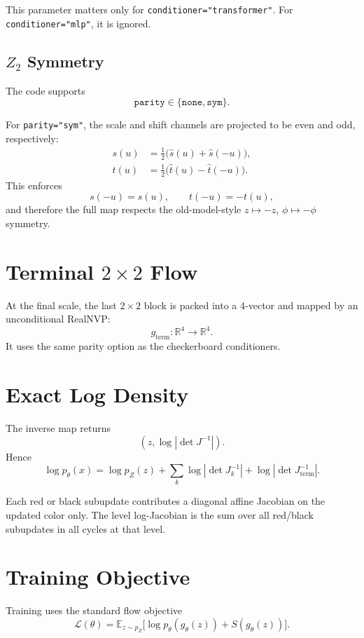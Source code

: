 \documentclass[11pt]{article}
\begin{document}
This parameter matters only for \texttt{conditioner="transformer"}. For
\texttt{conditioner="mlp"}, it is ignored.

\subsection{$Z_2$ Symmetry}

The code supports
\[
\texttt{parity}\in\{\texttt{none},\texttt{sym}\}.
\]

For \texttt{parity="sym"}, the scale and shift channels are projected to be
even and odd, respectively:
\begin{align}
s(u) &= \frac12 \bigl(\hat s(u) + \hat s(-u)\bigr), \\
t(u) &= \frac12 \bigl(\hat t(u) - \hat t(-u)\bigr).
\end{align}
This enforces
\[
s(-u)=s(u),\qquad t(-u)=-t(u),
\]
and therefore the full map respects the old-model-style
$z\mapsto -z$, $\phi\mapsto -\phi$ symmetry.

\section{Terminal $2\times 2$ Flow}

At the final scale, the last $2\times 2$ block is packed into a $4$-vector and
mapped by an unconditional RealNVP:
\[
g_{\mathrm{term}}:\mathbb{R}^4\to \mathbb{R}^4.
\]
It uses the same parity option as the checkerboard conditioners.

\section{Exact Log Density}

The inverse map returns
\[
(z,\log |\det J^{-1}|).
\]
Hence
\begin{equation}
\log p_\theta(x) = \log p_Z(z) + \sum_k \log |\det J_k^{-1}| + \log |\det J_{\mathrm{term}}^{-1}|.
\end{equation}

Each red or black subupdate contributes a diagonal affine Jacobian on the
updated color only. The level log-Jacobian is the sum over all red/black
subupdates in all cycles at that level.

\section{Training Objective}

Training uses the standard flow objective
\begin{equation}
\mathcal L(\theta) =
\mathbb E_{z\sim p_Z}
\bigl[
\log p_\theta(g_\theta(z)) + S(g_\theta(z))
\bigr].
\end{equation}
\end{document}
